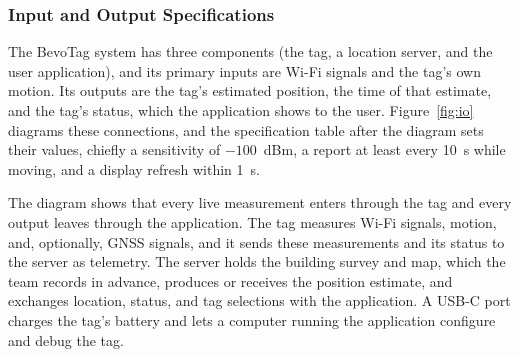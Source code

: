 \documentclass[12pt,letterpaper]{article}
\begin{document}
\subsubsection{Input and Output Specifications}
The BevoTag system has three components (the tag, a location server, and the user application), and
its primary inputs are Wi-Fi signals and the tag's own motion. Its outputs are the tag's estimated
position, the time of that estimate, and the tag's status, which the application shows to the user.
Figure~\ref{fig:io} diagrams these connections, and the specification table after the diagram sets
their values, chiefly a sensitivity of $-100$~dBm, a report at least every 10~s
while moving, and a display refresh within 1~s.

The diagram shows that every live measurement enters through the tag and every output leaves
through the application. The tag measures Wi-Fi signals, motion, and, optionally, GNSS signals, and
it sends these measurements and its status to the server as telemetry. The server holds the
building survey and map, which the team records in advance, produces or receives the position
estimate, and exchanges location, status, and tag selections with the application. A USB-C port
charges the tag's battery and lets a computer running the application configure and debug the tag.
\end{document}
